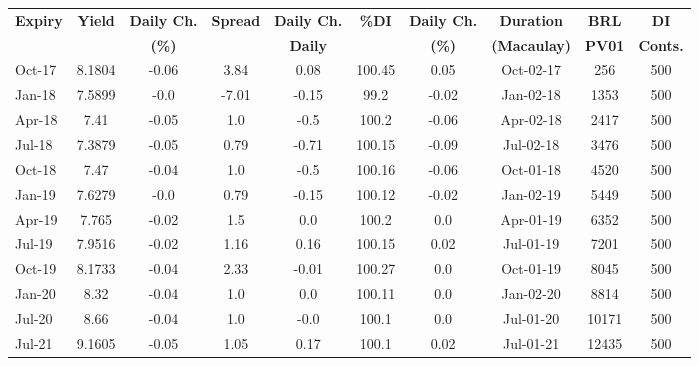 \documentclass[article,crop=false]{standalone}%
\begin{document}
%
\normalsize%
\setlength{\tabcolsep}{0.15cm}%
\begin{tabular}[h]{l|c c|c c|c c|c c c}%
\hline%
\rowcolor{white}%
\textbf{Expiry}&\textbf{Yield}&\textbf{Daily Ch.}&\textbf{Spread}&\textbf{Daily Ch.}&\textbf{\%DI}&\textbf{Daily Ch.}&\textbf{Duration}&\textbf{BRL}&\textbf{DI}\\%
\rowcolor{white}%
\textbf{}&\textbf{}&\textbf{(\%)}&\textbf{}&\textbf{Daily}&\textbf{}&\textbf{(\%)}&\textbf{(Macaulay)}&\textbf{PV01}&\textbf{Conts.}\\%
\hline%
\rowcolor{lightgray}%
Oct{-}17&8.1804&{-}0.06&3.84&0.08&100.45&0.05&Oct{-}02{-}17&256&500\\%
\rowcolor{white}%
Jan{-}18&7.5899&{-}0.0&{-}7.01&{-}0.15&99.2&{-}0.02&Jan{-}02{-}18&1353&500\\%
\rowcolor{lightgray}%
Apr{-}18&7.41&{-}0.05&1.0&{-}0.5&100.2&{-}0.06&Apr{-}02{-}18&2417&500\\%
\rowcolor{white}%
Jul{-}18&7.3879&{-}0.05&0.79&{-}0.71&100.15&{-}0.09&Jul{-}02{-}18&3476&500\\%
\rowcolor{lightgray}%
Oct{-}18&7.47&{-}0.04&1.0&{-}0.5&100.16&{-}0.06&Oct{-}01{-}18&4520&500\\%
\rowcolor{white}%
Jan{-}19&7.6279&{-}0.0&0.79&{-}0.15&100.12&{-}0.02&Jan{-}02{-}19&5449&500\\%
\rowcolor{lightgray}%
Apr{-}19&7.765&{-}0.02&1.5&0.0&100.2&0.0&Apr{-}01{-}19&6352&500\\%
\rowcolor{white}%
Jul{-}19&7.9516&{-}0.02&1.16&0.16&100.15&0.02&Jul{-}01{-}19&7201&500\\%
\rowcolor{lightgray}%
Oct{-}19&8.1733&{-}0.04&2.33&{-}0.01&100.27&0.0&Oct{-}01{-}19&8045&500\\%
\rowcolor{white}%
Jan{-}20&8.32&{-}0.04&1.0&0.0&100.11&0.0&Jan{-}02{-}20&8814&500\\%
\rowcolor{lightgray}%
Jul{-}20&8.66&{-}0.04&1.0&{-}0.0&100.1&0.0&Jul{-}01{-}20&10171&500\\%
\rowcolor{white}%
Jul{-}21&9.1605&{-}0.05&1.05&0.17&100.1&0.02&Jul{-}01{-}21&12435&500\\%
\hline%
\end{tabular}%
\end{document}
